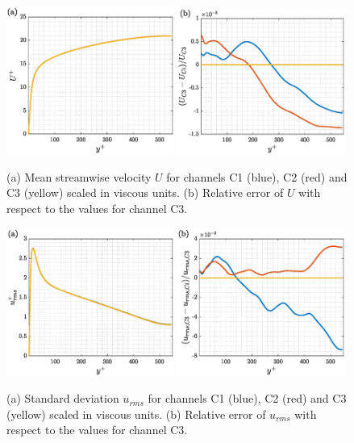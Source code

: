 \begin{figure}[h!]
\centering
\includegraphics[width=0.49\textwidth ]{imgs/WC/U.eps}
\includegraphics[width=0.49\textwidth]{imgs/WC/relerr_U.eps}
\caption{ \label{fig:WC_stats} (a) Mean streamwise velocity $U$ for channels C1 (blue), C2 (red) and C3 (yellow) scaled in viscous units.
(b) Relative error of $U$ with respect to the values for channel C3.}
\end{figure}
\begin{figure}[h!]
\centering
\includegraphics[width=0.49\textwidth]{imgs/WC/u_rms.eps}
\includegraphics[width=0.49\textwidth]{imgs/WC/relerr_u_rms.eps}
\caption{ \label{fig:WC_stats} (a) Standard deviation $u_{rms}$ for channels C1 (blue), C2 (red) and C3 (yellow) scaled in viscous units.
(b) Relative error of $u_{rms}$ with respect to the values for channel C3.}
\end{figure}


